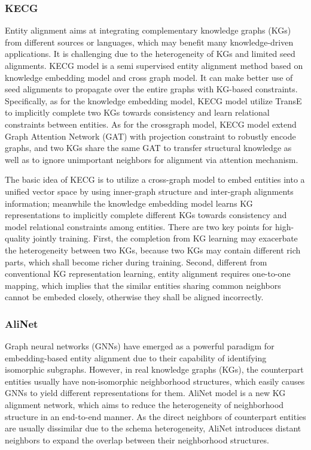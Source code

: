 \documentclass[sigconf]{acmart}
\begin{document}
{\subsubsection{KECG \cite{li2019semi}}

Entity alignment aims at integrating complementary knowledge graphs (KGs) from different sources or languages, which may benefit many knowledge-driven applications. It is challenging due to the heterogeneity of KGs and limited seed alignments. KECG model is a semi supervised entity alignment method based on knowledge embedding model and cross graph model. It can make better use of seed alignments to propagate over the entire graphs with KG-based constraints. Specifically, as for the knowledge embedding model, KECG model utilize TransE to implicitly complete two KGs towards consistency and learn relational constraints between entities. As for the crossgraph model, KECG model extend Graph Attention Network (GAT) with projection constraint to robustly encode graphs, and two KGs share the same GAT to transfer structural knowledge as well as to ignore unimportant neighbors for alignment via attention mechanism. 

The basic idea of KECG is to utilize a cross-graph model to embed entities into a unified vector space by using inner-graph structure and inter-graph alignments information; meanwhile the knowledge embedding model learns KG representations to implicitly complete different KGs towards consistency and model relational constraints among entities. There are two key points for high-quality jointly training. First, the completion from KG learning may exacerbate the heterogeneity between two KGs, because two KGs may contain different rich parts, which shall become richer during training. Second, different from conventional KG representation learning, entity alignment requires one-to-one mapping, which implies that the similar entities sharing common neighbors cannot be embeded closely, otherwise they shall be aligned incorrectly.


\subsubsection{AliNet \cite{sun2020knowledge}}

Graph neural networks (GNNs) have emerged as a powerful paradigm for embedding-based entity alignment due to their capability of identifying isomorphic subgraphs. However, in real knowledge graphs (KGs), the counterpart entities usually have non-isomorphic neighborhood structures, which easily causes GNNs to yield different representations for them. AliNet model is a new KG alignment network, which aims to reduce the heterogeneity of neighborhood structure in an end-to-end manner. As the direct neighbors of counterpart entities are usually dissimilar due to the schema heterogeneity, AliNet introduces distant neighbors to expand the overlap between their neighborhood structures.

}
\end{document}

